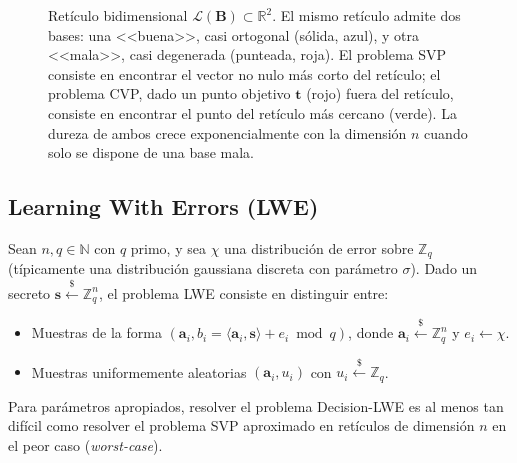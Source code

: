 \begin{figure}[htbp]
\caption{Retículo bidimensional $\mathcal{L}(\mathbf{B}) \subset \mathbb{R}^2$. El mismo retículo admite dos bases: una <<buena>>, casi ortogonal (sólida, azul), y otra <<mala>>, casi degenerada (punteada, roja). El problema SVP consiste en encontrar el vector no nulo más corto del retículo; el problema CVP, dado un punto objetivo $\mathbf{t}$ (rojo) fuera del retículo, consiste en encontrar el punto del retículo más cercano (verde). La dureza de ambos crece exponencialmente con la dimensión $n$ cuando solo se dispone de una base mala.}
\label{fig:lattice_2d}
\end{figure}

\subsection{Learning With Errors (LWE)}

\begin{definicion}
\label{def:lwe}
Sean $n, q \in \mathbb{N}$ con $q$ primo, y sea $\chi$ una distribución de error sobre $\mathbb{Z}_q$ (típicamente una distribución gaussiana discreta con parámetro $\sigma$). Dado un secreto $\mathbf{s} \xleftarrow{\$} \mathbb{Z}_q^n$, el problema LWE consiste en distinguir entre:
\begin{itemize}
  \item Muestras de la forma $(\mathbf{a}_i, b_i = \langle \mathbf{a}_i, \mathbf{s} \rangle + e_i \bmod q)$, donde $\mathbf{a}_i \xleftarrow{\$} \mathbb{Z}_q^n$ y $e_i \leftarrow \chi$.
  \item Muestras uniformemente aleatorias $(\mathbf{a}_i, u_i)$ con $u_i \xleftarrow{\$} \mathbb{Z}_q$.
\end{itemize}
\end{definicion}

\begin{teorema}[Regev, 2005]
Para parámetros apropiados, resolver el problema Decision-LWE es al menos tan difícil como resolver el problema SVP aproximado en retículos de dimensión $n$ en el peor caso (\emph{worst-case}).
\end{teorema}

